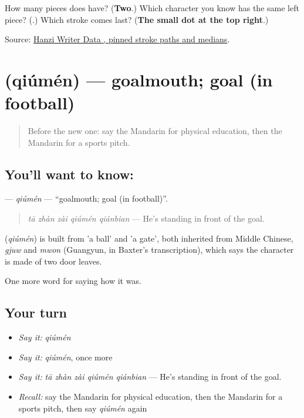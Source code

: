 \begin{tcolorbox}[breakable,colback=teal!4,colframe=teal!35!black,title={Before you move on}]
How many pieces does  have? (\textbf{Two}.) Which character you know has the same left piece? (\textbf{}.) Which stroke comes last? (\textbf{The small dot at the top right}.)

Source: \href{https://raw.githubusercontent.com/chanind/hanzi-writer-data/68d10a4b21150cae5e1ebbd223eed289cf32d90c/data/\%E7\%90\%83.json}{Hanzi Writer Data , pinned stroke paths and medians}.
\end{tcolorbox}
\section[\texorpdfstring{\zh{球门} (qiúmén)}{球门 (qiúmén)}]{ (qiúmén) — goalmouth; goal (in football)}

\label{lesson:ZH-C498-qiumen}



\begin{quote}
Before the new one: say the Mandarin for physical education, then the Mandarin for a sports pitch.
\end{quote}

\subsection*{You'll want to know: }
\textbf{} — \emph{qiúmén} — \textquotedblleft{}goalmouth; goal (in football)\textquotedblright{}.

\begin{quote}
\textbf{} \emph{tā zhàn zài qiúmén qiánbian} — He's standing in front of the goal.
\end{quote}

\begin{cousinweb}
\textbf{} (\emph{qiúmén}) is built from  'a ball' and  'a gate', both inherited from Middle Chinese, \emph{gjuw} and \emph{mwon} (Guangyun, in Baxter's transcription), which says the character is made of two door leaves.
\end{cousinweb}

\begin{grammarlens}[title={What you've built}]
One more word for saying how it was.
\end{grammarlens}

\subsection*{Your turn}
\begin{itemize}
\raggedright
  \item \emph{Say it:} \emph{qiúmén}
  \item \emph{Say it:} \emph{qiúmén}, once more
  \item \emph{Say it:} \emph{tā zhàn zài qiúmén qiánbian} — He's standing in front of the goal.
  \item \emph{Recall:} say the Mandarin for physical education, then the Mandarin for a sports pitch, then say \emph{qiúmén} again
\end{itemize}

